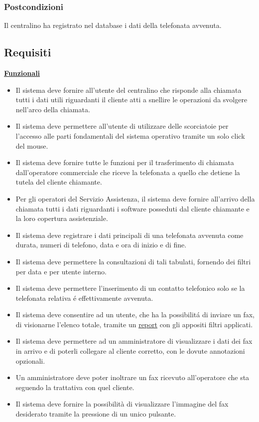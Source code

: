 \subsubsection*{Postcondizioni} Il centralino ha registrato nel database i dati della telefonata avvenuta.

\newpage
\subsection{Requisiti}
\underline{\textbf{Funzionali}}
\begin{itemize}
\item Il sistema deve fornire all'utente del centralino che risponde alla chiamata tutti i dati utili riguardanti il cliente atti a snellire le operazioni da svolgere nell'arco della chiamata.
\item Il sistema deve permettere all'utente di utilizzare delle scorciatoie per l'accesso alle parti fondamentali del sistema operativo tramite un solo click del mouse.
\item Il sistema deve fornire tutte le funzioni per il trasferimento di chiamata dall'operatore commerciale che riceve la telefonata a quello che detiene la tutela del cliente chiamante.
\item Per gli operatori del Servizio Assistenza, il sistema deve fornire all'arrivo della chiamata tutti i dati riguardanti i software posseduti dal cliente chiamante e la loro copertura assistenziale.
\item Il sistema deve registrare i dati principali di una telefonata avvenuta come durata, numeri di telefono, data e ora di inizio e di fine. 
\item Il sistema deve permettere la consultazioni di tali tabulati, fornendo dei filtri per data e per utente interno. 
\item Il sistema deve permettere l'inserimento di un contatto telefonico solo se la telefonata relativa \'e effettivamente avvenuta.
\item Il sistema deve consentire ad un utente, che ha la possibilit\'a di inviare un fax, di visionarne l'elenco totale, tramite un \hyperlink{report}{\underline{report}} con gli appositi filtri applicati.
\item Il sistema deve permettere ad un amministratore di visualizzare i dati dei fax in arrivo e di poterli collegare al cliente corretto, con le dovute annotazioni opzionali. 
\item Un amministratore deve poter inoltrare un fax ricevuto all'operatore che sta seguendo la trattativa con quel cliente.
\item Il sistema deve fornire la possibilit\`a di visualizzare l'immagine del fax desiderato tramite la pressione di un unico pulsante.
\end{itemize}

